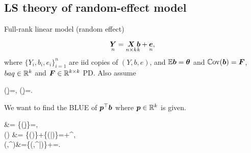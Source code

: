 \documentclass[10pt,a4paper]{book}
\begin{document}
\subsection{LS theory of random-effect model}
\begin{defbox}{Full-rank linear model (random effect)}
	\begin{definition}\label{def:LR_full_rank_random_effect}
		\begin{equation}\label{eq:LR_mat_random_effect}
			\underset{n}{{\boldsymbol Y}}=\underset{n\times k}{{\boldsymbol X}} \underset{k}{{\boldsymbol b}} +\underset{n}{{\boldsymbol e}},
		\end{equation}
		where $\{Y_i,b_i,e_i\}_{i=1}^n$ are iid copies of $(Y,b,e)$,
		and $\mathbb E{\boldsymbol b}={\boldsymbol\theta}$ and $\mathbb{C}\mathrm{ov}({\boldsymbol b})={\boldsymbol F}$, $baq\in\mathbb R^k$ and ${\boldsymbol F}\in\mathbb R^{k\times k}$ PD. Also assume  
		\begin{sequation*}
			\bbE(\e\mid\b)=\0, \quad \Cov(\e\mid\b)=\V.
		\end{sequation*}    
	\end{definition}
\end{defbox}
We want to find the BLUE of ${\boldsymbol p}^\top{\boldsymbol b}$ where ${\boldsymbol p}\in\mathbb R^k$ is given.
\begin{salign*}
	\bbE\Y &= \bbE\{\bbE(\Y\mid\b)\}=\X\baq,\\
	\Var(\Y) &= \bbE\{\Var(\mid{})\}+\Var\{\bbE(|)\}=\V+^\top, \\
	\Cov(,^\top{})&=\bbE\{\Cov(,^\top{}|)\}+=.
\end{salign*}  
\end{document}
